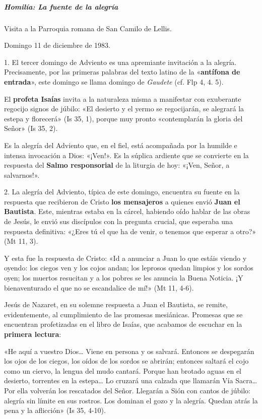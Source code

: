 \documentclass[]{article}
\let\oldsubparagraph\subparagraph
\renewcommand{\subparagraph}[1]{\oldsubparagraph{#1}\mbox{}}
\begin{document}
\protect\hypertarget{_Toc448662740}{}{\protect\hypertarget{_Toc448690259}{}{\protect\hypertarget{_Toc448708282}{}{\protect\hypertarget{_Toc448709368}{}{\protect\hypertarget{_Toc449554370}{}{}}}}}

\subparagraph{Homilía: La fuente de la
alegría}\label{homiluxeda-la-fuente-de-la-alegruxeda}

Visita a la Parroquia romana de San Camilo de Lellis.

Domingo 11 de diciembre de 1983.

1. El tercer domingo de Adviento es una apremiante invitación a la
alegría. Precisamente, por las primeras palabras del texto latino de la
«\textbf{antífona de entrada}», este domingo se llama domingo de
\emph{Gaudete} (cf. Flp 4, 4. 5).

El \textbf{profeta Isaías} invita a la naturaleza misma a manifestar con
exuberante regocijo signos de júbilo: «El desierto y el yermo se
regocijarán, se alegrará la estepa y florecerá» (Is 35, 1), porque muy
pronto «contemplarán la gloria del Señor» (Is 35, 2).

Es la alegría del Adviento que, en el fiel, está acompañada por la
humilde e intensa invocación a Dios: «¡Ven!». Es la súplica ardiente que
se convierte en la respuesta del \textbf{Salmo responsorial} de la
liturgia de hoy: «¡Ven, Señor, a salvarnos!».

2. La alegría del Adviento, típica de este domingo, encuentra su fuente
en la respuesta que recibieron de Cristo \textbf{los mensajeros} a
quienes envió \textbf{Juan el Bautista}. Este, mientras estaba en la
cárcel, habiendo oído hablar de las obras de Jesús, le envió sus
discípulos con la pregunta crucial, que esperaba una respuesta
definitiva: «¿Eres tú el que ha de venir, o tenemos que esperar a otro?»
(Mt 11, 3).

Y esta fue la respuesta de Cristo: «Id a anunciar a Juan lo que estáis
viendo y oyendo: los ciegos ven y los cojos andan; los leprosos quedan
limpios y los sordos oyen; los muertos resucitan y a los pobres se les
anuncia la Buena Noticia. ¡Y bienaventurado el que no se escandalice de
mí!» (Mt 11, 4-6).

Jesús de Nazaret, en su solemne respuesta a Juan el Bautista, se remite,
evidentemente, al cumplimiento de las promesas mesiánicas. Promesas que
se encuentran profetizadas en el libro de Isaías, que acabamos de
escuchar en la \textbf{primera lectura}:

«He aquí a vuestro Dios\ldots{} Viene en persona y os salvará. Entonces
se despegarán los ojos de los ciegos, los oídos de los sordos se
abrirán; entonces saltará el cojo como un ciervo, la lengua del mudo
cantará. Porque han brotado aguas en el desierto, torrentes en la
estepa\ldots{} Lo cruzará una calzada que llamarán Vía Sacra\ldots{} Por
ella volverán los rescatados del Señor. Llegarán a Sión con cantos de
júbilo: alegría sin límite en sus rostros. Los dominan el gozo y la
alegría. Quedan atrás la pena y la aflicción» (Is 35, 4-10).
\end{document}

